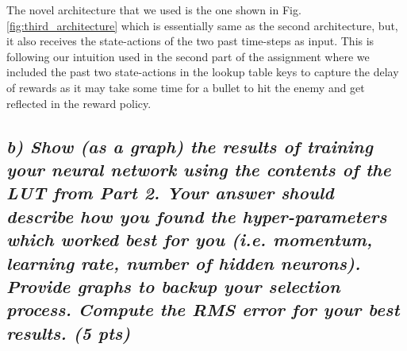 \documentclass[a4paper,12pt]{article}
\begin{document}
The novel architecture that we used is the one shown in Fig. \ref{fig:third_architecture} which is essentially same as the second architecture, but, it also receives the state-actions of the two past time-steps as input. This is following our intuition used in the second part of the assignment where we included the past two state-actions in the lookup table keys to capture the delay of rewards as it may take some time for a bullet to hit the enemy and get reflected in the reward policy. 

\pagebreak
\subsection*{\emph{b) Show (as a graph) the results of training your neural network using the contents of the LUT from Part 2. Your answer should describe how you found the hyper-parameters which worked best for you (i.e. momentum, learning rate, number of hidden neurons). Provide graphs to backup your selection process. Compute the RMS error for your best results. (5 pts)}}
\end{document}
